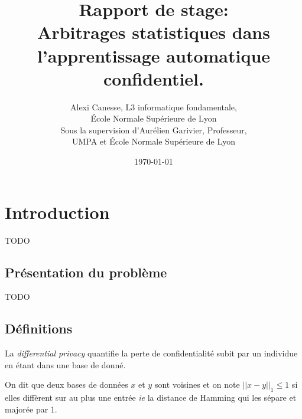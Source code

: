 

\usepackage{tkz-base}
\usepackage{algorithm}
\usepackage{algorithmic}
\setlength\parindent{0pt}





\title{Rapport de stage:\\
Arbitrages statistiques dans l'apprentissage automatique confidentiel.
}           
\author{{\sc Alexi Canesse}, L3 informatique fondamentale,\\École Normale Supérieure de Lyon\\
Sous la supervision d'{\sc Aurélien Garivier}, Professeur,\\ UMPA et École Normale Supérieure de Lyon}
\date{\today}          

\sloppy                  

\pgfplotsset{compat=1.16}






\maketitle
\newpage

\tableofcontents
\newpage

\section{Introduction}
TODO

\subsection{Présentation du problème}

TODO

\subsection{Définitions}

La \textit{differential privacy} quantifie la perte de confidentialité subit par un individue en étant dans une base de donné. \\


On dit que deux bases de données \(x\) et \(y\) sont voisines et on note \(||x - y||_1 \leq 1\) si elles diffèrent sur au plus une entrée \textit{ie} la distance de {\sc Hamming} qui les sépare et majorée par 1.\\

